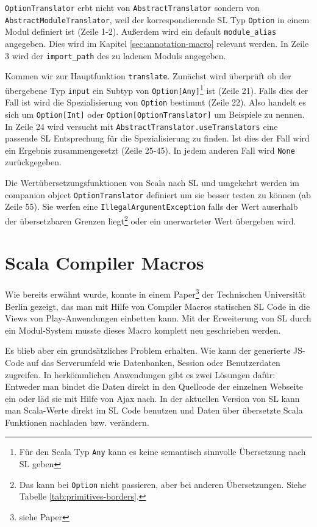 \documentclass[12pt]{scrreprt}
\begin{document}
\lstinline!OptionTranslator! erbt nicht von \lstinline!AbstractTranslator! sondern von \lstinline!AbstractModuleTranslator!, weil der korrespondierende \ac{SL} Typ \lstinline!Option! in einem Modul definiert ist (Zeile 1-2). Außerdem wird ein default \lstinline!module_alias! angegeben. Dies wird im Kapitel \ref{sec:annotation-macro} relevant werden. In Zeile 3 wird der \lstinline!import_path! des zu ladenen Moduls angegeben. 

Kommen wir zur Hauptfunktion \lstinline!translate!. Zunächst wird überprüft ob der übergebene Typ \lstinline!input! ein Subtyp von \lstinline!Option[Any]!\footnote{Für den Scala Typ \lstinline!Any! kann es keine semantisch sinnvolle Übersetzung nach \ac{SL} geben} ist (Zeile 21). Falls dies der Fall ist wird die Spezialisierung von \lstinline!Option! bestimmt (Zeile 22). Also handelt es sich um \lstinline!Option[Int]! oder \lstinline!Option[OptionTranslator]! um Beispiele zu nennen. In Zeile 24 wird versucht mit \lstinline!AbstractTranslator.useTranslators! eine passende \ac{SL} Entsprechung für die Spezialisierung zu finden. Ist dies der Fall wird ein Ergebnis zusammengesetzt (Zeile 25-45). In jedem anderen Fall wird \lstinline!None! zurückgegeben.

Die Wertübersetzungsfunktionen von Scala nach \ac{SL} und umgekehrt werden im companion object \lstinline!OptionTranslator! definiert um sie besser testen zu können (ab Zeile 55). Sie werfen eine \lstinline!IllegalArgumentException! falls der Wert auserhalb der übersetzbaren Grenzen liegt\footnote{Das kann bei \lstinline!Option! nicht passieren, aber bei anderen Übersetzungen. Siehe Tabelle \ref{tab:primitives-borders}.} oder ein unerwarteter Wert übergeben wird.

\chapter{Scala Compiler Macros}
\label{chap:scala-compiler-macros}

Wie bereits erwähnt wurde, konnte in einem Paper\footnote{siehe Paper} der Technischen Universität Berlin gezeigt, das man mit Hilfe von Compiler Macros statischen \ac{SL} Code in die Views von Play-Anwendungen einbetten kann. Mit der Erweiterung von \ac{SL} durch ein Modul-System musste dieses Macro komplett neu geschrieben werden.

Es blieb aber ein grundsätzliches Problem erhalten. Wie kann der generierte \ac{JS}-Code auf das Serverumfeld wie Datenbanken, Session oder Benutzerdaten zugreifen. In herkömmlichen Anwendungen gibt es zwei Lösungen dafür: Entweder man bindet die Daten direkt in den Quellcode der einzelnen Webseite ein oder läd sie mit Hilfe von Ajax nach. In der aktuellen Version von \ac{SL} kann man Scala-Werte direkt im \ac{SL} Code benutzen und Daten über übersetzte Scala Funktionen nachladen bzw. verändern.
\end{document}
